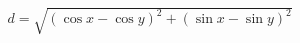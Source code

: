 \documentclass[preview]{standalone}
\begin{document}
\begin{align*}
d = \sqrt{(\cos x - \cos y)^2 + (\sin x - \sin y)^2}
\end{align*}
\end{document}
